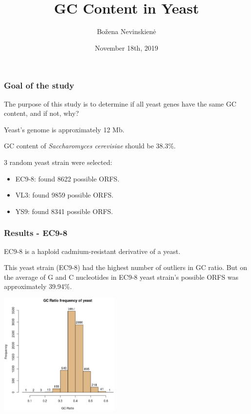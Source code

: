 \documentclass{beamer}
\title[Short title]{GC Content in Yeast} %
\author{Bo\v{z}ena Nevinskien\.{e}} %
\institute[UCLA] %
{
Vilnius University, Systems Biology \\ %
\medskip
}
\date{November 18th, 2019}
\begin{document}
\begin{frame}
\titlepage 
\end{frame}


\begin{frame}
\frametitle{Goal of the study}
The purpose of this study is to determine if all yeast genes have the same GC content, and if not, why? 

Yeast's genome is approximately 12 Mb. 

GC content of \emph{Saccharomyces cerevisiae} should be 38.3\%.

3 random yeast strain were selected:
\begin{itemize}
\item EC9-8: found 8622 possible ORFS.
\item VL3: found 9859 possible ORFS.
\item YS9: found 8341 possible ORFS.
\end{itemize}
\end{frame}


\begin{frame}
\frametitle{Results - EC9-8}
EC9-8 is a haploid cadmium-resistant derivative of a yeast.

This yeast strain (EC9-8) had the highest number of outliers in GC ratio.
But on the average of G and C nucleotides in EC9-8 yeast strain's possible ORFS was approximately 39.94\%.
\begin{minipage}{0.4\textwidth}
\includegraphics[width=60mm]{images/EC9-8_ASinica_2011_AGSJ01000000.eps}
\end{minipage}
\end{frame}

\end{document}
